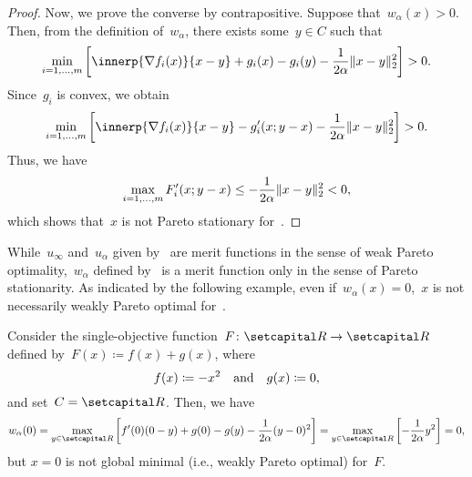 \documentclass[../../main]{subfiles}
\begin{document}
\begin{proof}
    Now, we prove the converse by contrapositive.
    Suppose that~$w_\alpha(x) > 0$.
    Then, from the definition of~$w_\alpha$, there exists some~$y \in C$ such that
    \begin{equation}
        \min_{i = 1, \dots, m} \left[ \innerp{\nabla f_i(x)}{x - y} + g_i(x) - g_i(y) - \frac{1}{2 \alpha} \norm{x - y}_2^2 \right] > 0
    .\end{equation} 
    Since~$g_i$ is convex, we obtain
    \begin{equation}
        \min_{i = 1, \dots, m} \left[ \innerp{\nabla f_i(x)}{x - y} - g_i'(x; y - x) - \frac{1}{2 \alpha} \norm{x - y}_2^2 \right] > 0
    .\end{equation} 
    Thus, we have
    \begin{equation}
        \max_{i = 1, \dots, m} F_i'(x; y - x) \le - \frac{1}{2 \alpha} \lVert x - y\rVert_2^2 < 0
    ,\end{equation} 
    which shows that~$x$ is not Pareto stationary for~.
\end{proof}
While~$u_\infty$ and~$u_\alpha$ given by~ are merit functions in the sense of weak Pareto optimality,~$w_\alpha$ defined by~ is a merit function only in the sense of Pareto stationarity.
As indicated by the following example, even if~$w_\alpha(x) = 0$,~$x$ is not necessarily weakly Pareto optimal for~.
\begin{example}
    Consider the single-objective function~$F\colon \setR \to \setR$ defined by~$F(x) \coloneqq f(x) + g(x)$, where
    \begin{equation}
        f(x) \coloneqq - x^2 \quad \text{and} \quad g(x) \coloneqq 0
    ,\end{equation}
    and set~$C = \setR$.
    Then, we have
    \begin{equation}
        w_\alpha(0) = \max_{y \in \setR} \left[ f'(0) (0 - y) + g(0) - g(y) - \frac{1}{2 \alpha} (y - 0)^2 \right] 
        = \max_{y \in \setR} \left[ - \frac{1}{2 \alpha} y^2 \right] = 0
    ,\end{equation} 
    but $x = 0$ is not global minimal (i.e., weakly Pareto optimal) for~$F$.
\end{example}
\end{document}
